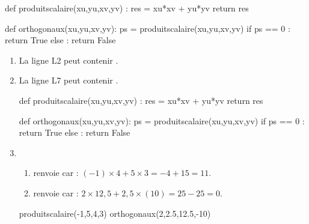 \documentclass[a4paper,11pt]{article}
\begin{document}
\medskip


\begin{pyconcode}
def produitscalaire(xu,yu,xv,yv) :
	res = xu*xv + yu*yv
	return res
	

def orthogonaux(xu,yu,xv,yv):
	ps = produitscalaire(xu,yu,xv,yv)
	if ps == 0 :
		return True
	else :
		return False
	

\end{pyconcode}

\begin{enumerate}
	\item La ligne \textsf{L2} peut contenir .
	\item La ligne \textsf{L7} peut contenir .
	\begin{envpython}[10cm]
		def produitscalaire(xu,yu,xv,yv) :
			res = xu*xv + yu*yv
			return res
		
		def orthogonaux(xu,yu,xv,yv):
			ps = produitscalaire(xu,yu,xv,yv)
			if ps == 0 :
				return True
			else :
				return False
	\end{envpython}
	\item 
	\begin{enumerate}
		\item {} renvoie  car : $(-1) \times 4 + 5 \times 3 = -4+15=11$.
		\item {} renvoie  car : $2 \times 12,5 + 2,5 \times (10) = 25 - 25=0.$
	\end{enumerate}
	\begin{envconsolepython}[10cm]
		produitscalaire(-1,5,4,3)
		orthogonaux(2,2.5,12.5,-10)
	\end{envconsolepython}
\end{enumerate}
\end{document}
